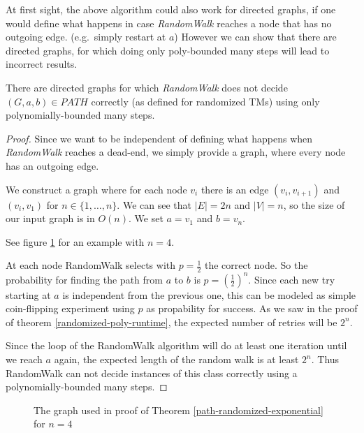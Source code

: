 At first sight, the above algorithm could also work for directed graphs,
if one would define what happens in case \emph{RandomWalk} reaches a
node that has no outgoing edge. (e.g.~simply restart at $a$) However we
can show that there are directed graphs, for which doing only
poly-bounded many steps will lead to incorrect results.

\vspace{0.5cm}

\begin{thm}
\label{path-randomized-exponential}
There are directed graphs for which {\em RandomWalk} does not decide $(G, a, b) \in PATH$ correctly
(as defined for randomized TMs) using only polynomially-bounded many steps.
\end{thm}

\begin{proof}
Since we want to be independent of defining what happens when {\em RandomWalk} reaches a dead-end,
we simply provide a graph, where every node has an outgoing edge.

We construct a graph where for each node $v_i$ there is an edge $(v_i, v_{i+1})$ and $(v_i, v_1)$ for $n \in \{ 1, \dots, n \}$.
We can see that $|E| = 2n$ and $|V| = n$, so the size of our input graph is in $O(n)$. We set $a = v_1$ and $b = v_n$.

See figure \ref{graph-randomized} for an example with $n=4$.

At each node RandomWalk selects with $p = \frac{1}{2}$ the correct node. So the probability for finding the path
from $a$ to $b$ is $p = \left(\frac{1}{2}\right)^n$. Since each new try starting at $a$ is independent from the previous
one, this can be modeled as simple coin-flipping experiment using $p$ as propability for success.
As we saw in the proof of theorem \ref{randomized-poly-runtime}, the expected number of retries will be $2^n$.

Since the loop of the RandomWalk algorithm will do at least one iteration until
we reach $a$ again, the expected length of the random walk is at least $2^n$.
Thus RandomWalk can not decide instances of this class correctly using a polynomially-bounded many steps.
\end{proof}

\begin{figure}
\caption{The graph used in proof of Theorem \ref{path-randomized-exponential} for $n=4$}
\label{graph-randomized}
\end{figure}

